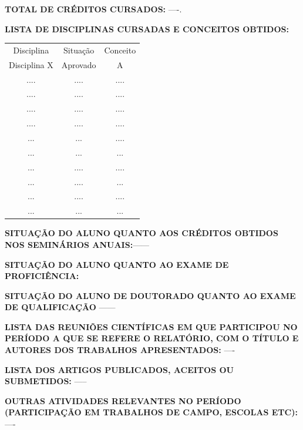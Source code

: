 \documentclass[12pt,a4paper,final]{report}%
\begin{document}
\begin{flushleft}

\textbf{TOTAL DE CRÉDITOS CURSADOS:} ----.

\hspace{60cm}

\textbf{LISTA DE DISCIPLINAS CURSADAS E CONCEITOS OBTIDOS:}

\hspace{60cm}

\begin{table}[h]
\centering
\begin{tabular}{ccc}
 
Disciplina &Situação& Conceito\\ 
                      
Disciplina X& Aprovado   & A \\%
 ....& .... & .... \\
 ....&....  &  ....\\
 ....& .... & .... \\
 ....& .... &....  \\
... &  ...&  ....\\
...& ... & ... \\
...& .... & .... \\
... & .... & ... \\
 ...& .... &....  \\
 ...& ... &...  \\
 
\end{tabular}
\end{table}

\textbf{SITUAÇ\~AO DO ALUNO QUANTO AOS CRÉDITOS OBTIDOS NOS SEMINÁRIOS ANUAIS:}------ %

\hspace{60cm}

\textbf{SITUAÇÃO DO ALUNO QUANTO AO EXAME DE PROFICIÊNCIA:}  %

\hspace{60cm}

\textbf{SITUAÇÃO DO ALUNO DE DOUTORADO QUANTO AO EXAME DE QUALIFICAÇÃO} ------%

\hspace{60cm}

\textbf{LISTA DAS REUNIÕES CIENTÍFICAS EM QUE PARTICIPOU NO PERÍODO A QUE SE REFERE O RELATÓRIO, COM O TÍTULO E AUTORES DOS TRABALHOS APRESENTADOS:} ----

\hspace{60cm}

\textbf{LISTA DOS ARTIGOS PUBLICADOS, ACEITOS OU SUBMETIDOS:} -----

\hspace{60cm}

\textbf{OUTRAS ATIVIDADES RELEVANTES NO PERÍODO (PARTICIPAÇ\~AO EM TRABALHOS DE CAMPO, ESCOLAS ETC):} ----%

\hspace{60cm}


\end{flushleft}
\end{document}

